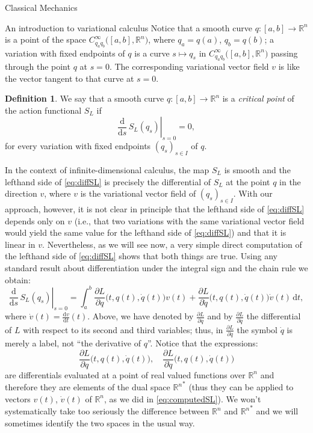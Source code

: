 \documentclass[oneside,a4paper,11pt]{amsbook}
\newcommand{\R}{\mathds R}
\newcommand{\dd}{\mathrm d}
\theoremstyle{remark}\newtheorem{exercise}{Exercise}[chapter]
\theoremstyle{plain}\newtheorem{teo}{Theorem}[section]
\theoremstyle{plain}\newtheorem{lem}[teo]{Lemma}
\theoremstyle{plain}\newtheorem{prop}[teo]{Proposition}
\theoremstyle{plain}\newtheorem{cor}[teo]{Corollary}
\theoremstyle{definition}\newtheorem{defin}[teo]{Definition}
\theoremstyle{remark}\newtheorem{rem}[teo]{Remark}
\theoremstyle{definition}\newtheorem{notation}[teo]{Notation}
\theoremstyle{definition}\newtheorem{convention}[teo]{Convention}
\theoremstyle{definition}\newtheorem{example}[teo]{Example}
\numberwithin{section}{chapter}
\numberwithin{equation}{section}
\begin{document}
\begin{chapter}{Classical Mechanics}
\begin{section}{An introduction to variational calculus}
Notice that a smooth curve $q:[a,b]\to\R^n$ is a point of the space $C^\infty_{q_aq_b}\big([a,b],\R^n\big)$,
where $q_a=q(a)$, $q_b=q(b)$; a variation with fixed endpoints of $q$ is a curve $s\mapsto q_s$ in
$C^\infty_{q_aq_b}\big([a,b],\R^n\big)$ passing through the point $q$ at $s=0$. The corresponding variational
vector field $v$ is like the vector tangent to that curve at $s=0$.
\begin{defin}\label{thm:defcriticalSL}
We say that a smooth curve $q:[a,b]\to\R^n$ is a {\em critical point\/} of the action functional $S_L$ if
\begin{equation}\label{eq:diffSL}
\left.\frac{\dd}{\dd s}\,S_L(q_s)\right\vert_{s=0}=0,
\end{equation}
for every variation with fixed endpoints $(q_s)_{s\in I}$ of $q$.
\end{defin}
In the context of infinite-dimensional calculus, the map $S_L$ is smooth and the lefthand side of
\eqref{eq:diffSL} is precisely the differential of $S_L$ at the point $q$ in the direction $v$, where $v$ is the
variational vector field of $(q_s)_{s\in I}$. With our approach, however, it is not clear in principle that the
lefthand side of \eqref{eq:diffSL} depends only on $v$ (i.e., that two variations with the same variational vector
field would yield the same value for the lefthand side of \eqref{eq:diffSL}) and that it is linear in $v$.
Nevertheless, as we will see now, a very simple direct computation of the lefthand side of \eqref{eq:diffSL}
shows that both things are true. Using any standard result about differentiation under the integral sign and
the chain rule we obtain:
\begin{equation}\label{eq:computedSL}
\left.\frac{\dd}{\dd s}\,S_L(q_s)\right\vert_{s=0}=
\int_a^b\frac{\partial L}{\partial q}\big(t,q(t),\dot q(t)\big)v(t)+
\frac{\partial L}{\partial\dot q}\big(t,q(t),\dot q(t)\big)\dot v(t)\,\dd t,
\end{equation}
where $\dot v(t)=\frac{\dd v}{\dd t}(t)$. Above, we have denoted by $\frac{\partial L}{\partial q}$ and
by $\frac{\partial L}{\partial\dot q}$ the differential of $L$ with respect to its second and third variables;
thus, in $\frac{\partial L}{\partial\dot q}$ the symbol $\dot q$ is merely a label, not ``the derivative of $q$''.
Notice that the expressions:
\[\frac{\partial L}{\partial q}\big(t,q(t),\dot q(t)\big),\quad\frac{\partial L}{\partial\dot q}\big(t,q(t),\dot q(t)\big)\]
are differentials evaluated at a point of real valued functions over $\R^n$ and therefore they are elements of the dual space
${\R^n}^*$ (thus they can be applied to vectors $v(t)$, $\dot v(t)$ of $\R^n$, as we did in \eqref{eq:computedSL}).
We won't systematically take too seriously the difference between $\R^n$ and ${\R^n}^*$ and we will sometimes
identify the two spaces in the usual way.


\end{section}
\end{chapter}
\end{document}
